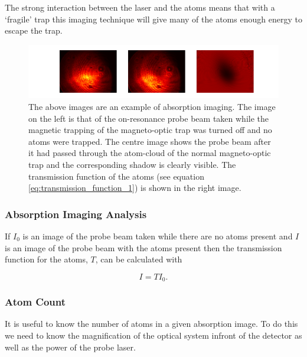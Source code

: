 The strong interaction between the laser and the atoms means that with a `fragile' trap this imaging technique will give many of the atoms enough energy to escape the trap.

\begin{figure}
\centering
\includegraphics[width=18cm]{figs/absorptionexample.pdf}
\caption{The above images are an example of absorption imaging.  The image on the left is that of the on-resonance probe beam taken while the magnetic trapping of the magneto-optic trap was turned off and no atoms were trapped. The centre image shows the probe beam after it had passed through the atom-cloud of the normal magneto-optic trap and the corresponding shadow is clearly visible. The transmission function of the atoms (see equation \ref{eq:transmission_function_1}) is shown in the right image.}
\end{figure}

\subsubsection{Absorption Imaging Analysis}

If $I_0$ is an image of the probe beam taken while there are no atoms present and $I$ is an image of the probe beam with the atoms present then the transmission function for the atoms, $T$, can be calculated with

\begin{equation}\label{eq:transmission_function_1}
I = T I_0.
\end{equation}

\subsubsection{Atom Count}


It is useful to know the number of atoms in a given absorption image. To do this we need to know the magnification of the optical system infront of the detector as well as the power of the probe laser.

